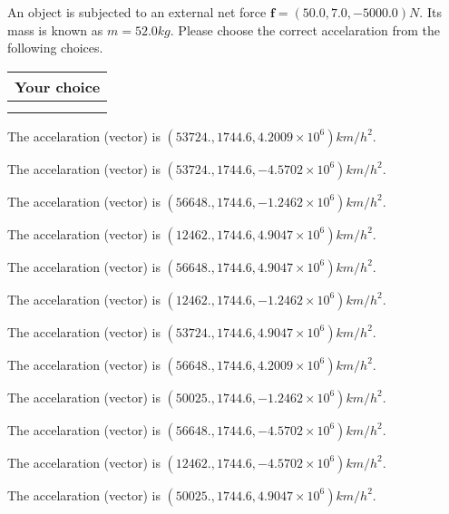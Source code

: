 \documentclass[12pt]{article}
\begin{document}
  
 
An object is subjected to an external net force $\mathbf{f}=(
50.0 ,
7.0,
-5000.0  )N$. Its mass is known as
$m= %
52.0  kg$. Please choose the correct accelaration
from the following choices.
 
  
  
\noindent\hspace{3.0in} \begin{tabular}{|l|}
\hline
Your choice \\
\hline
 \\ 
 \\ 
\hline
\end{tabular}
  
  
 
 
The accelaration (vector) is
$(
53724.,
1744.6 ,
4.2009 \times 10^{6}
)km/h^2.
$
 
 
The accelaration (vector) is
$(
53724.,
1744.6 ,
-4.5702 \times 10^{6}
)km/h^2.
$
 
 
The accelaration (vector) is
$(
56648.,
1744.6 ,
-1.2462 \times 10^{6}
)km/h^2.
$
 
 
The accelaration (vector) is
$(
12462.,
1744.6 ,
4.9047 \times 10^{6}
)km/h^2.
$
 
 
The accelaration (vector) is
$(
56648.,
1744.6 ,
4.9047 \times 10^{6}
)km/h^2.
$
 
 
The accelaration (vector) is
$(
12462.,
1744.6 ,
-1.2462 \times 10^{6}
)km/h^2.
$
 
 
The accelaration (vector) is
$(
53724.,
1744.6 ,
4.9047 \times 10^{6}
)km/h^2.
$
 
 
The accelaration (vector) is
$(
56648.,
1744.6 ,
4.2009 \times 10^{6}
)km/h^2.
$
 
 
The accelaration (vector) is
$(
50025.,
1744.6 ,
-1.2462 \times 10^{6}
)km/h^2.
$
 
 
The accelaration (vector) is
$(
56648.,
1744.6 ,
-4.5702 \times 10^{6}
)km/h^2.
$
 
 
The accelaration (vector) is
$(
12462.,
1744.6 ,
-4.5702 \times 10^{6}
)km/h^2.
$
 
 
The accelaration (vector) is
$(
50025.,
1744.6 ,
4.9047 \times 10^{6}
)km/h^2.
$
 
\end{document}

